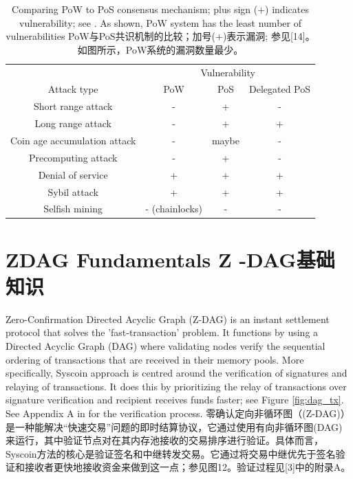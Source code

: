 \documentclass{ctexart}
\begin{document}
\begin{table}[h!]
\centering
\begin{tabular}{ |c|c|c|c| } 
\hline
 & \multicolumn{3}{|c|}{ Vulnerability } \\
 Attack type & PoW & PoS & Delegated PoS \\
\hline
Short range attack & - & + & - \\
Long range attack & - & + & + \\
Coin age accumulation attack & - & maybe & - \\
Precomputing attack & - & + & - \\
Denial of service & + & + & + \\
Sybil attack & + & + & + \\
Selfish mining & - (chainlocks) & - & - \\
\hline
\end{tabular}
\caption{Comparing PoW to PoS consensus mechanism; plus sign (+) indicates vulnerability; see \cite{Bit15}. As shown, PoW system has the least number of vulnerabilities PoW与PoS共识机制的比较；加号(+)表示漏洞; 参见[14]。如图所示，PoW系统的漏洞数量最少。}
\label{table:pow_vs_pos}
\end{table}

\section{ZDAG Fundamentals Z -DAG基础知识}

Zero-Confirmation Directed Acyclic Graph (Z-DAG) is an instant settlement protocol that solves the 'fast-transaction' problem. It functions by using a Directed Acyclic Graph (DAG) where validating nodes verify the sequential ordering of transactions that are received in their memory pools. More specifically, Syscoin approach is centred around the verification of signatures and relaying of transactions. It does this by prioritizing the relay of transactions over signature verification and recipient receives funds faster; see Figure \ref{fig:dag_tx}. See Appendix A in \cite{Sidb18} for the verification process. 零确认定向非循环图（(Z-DAG)）是一种能解决“快速交易”问题的即时结算协议，它通过使用有向非循环图(DAG) 来运行，其中验证节点对在其内存池接收的交易排序进行验证。具体而言，Syscoin方法的核心是验证签名和中继转发交易。它通过将交易中继优先于签名验证和接收者更快地接收资金来做到这一点；参见图12。验证过程见[3]中的附录A。
\end{document}
